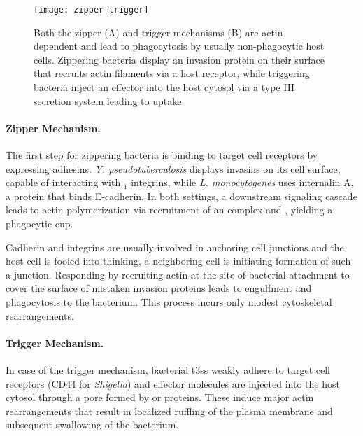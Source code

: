 \begin{figure}
  \centering
  \texttt{[image: zipper-trigger]}
  \caption[Zipper and trigger mechanisms for bacterial host-cell entry]{Both the zipper (A) and trigger mechanisms (B) are actin dependent and lead to phagocytosis by usually non-phagocytic host cells. Zippering bacteria display an invasion protein on their surface that recruits actin filaments via a host receptor, while triggering bacteria inject an effector into the host cytosol via a type III secretion system leading to uptake. \citep{Haglund2011}}
  \label{fig:zipper-trigger}
\end{figure}


\label{zipper-mechanism}

\paragraph{Zipper Mechanism.}
The first step for zippering bacteria is binding to target cell receptors by expressing adhesins. \textit{Y. pseudotuberculosis} displays invasins on its cell surface, capable of interacting with \textbeta$_1$ integrins, while \textit{L. monocytogenes} uses internalin A, a protein that binds E-cadherin. In both settings, a downstream signaling cascade leads to actin polymerization via recruitment of an  complex and , yielding a phagocytic cup.

Cadherin and integrins are usually involved in anchoring cell junctions and the host cell is fooled into thinking, a neighboring cell is initiating formation of such a junction. Responding by recruiting actin at the site of bacterial attachment to cover the surface of mistaken invasion proteins leads to engulfment and phagocytosis to the bacterium. This process incurs only modest cytoskeletal rearrangements. 


\paragraph{Trigger Mechanism.}
In case of the trigger mechanism, bacterial \gls{t3ss} weakly adhere to target cell receptors (CD44 for \textit{Shigella}) and effector molecules are injected into the host cytosol through a pore formed by  or  proteins. These induce major actin rearrangements that result in localized ruffling of the plasma membrane and subsequent swallowing of the bacterium.

